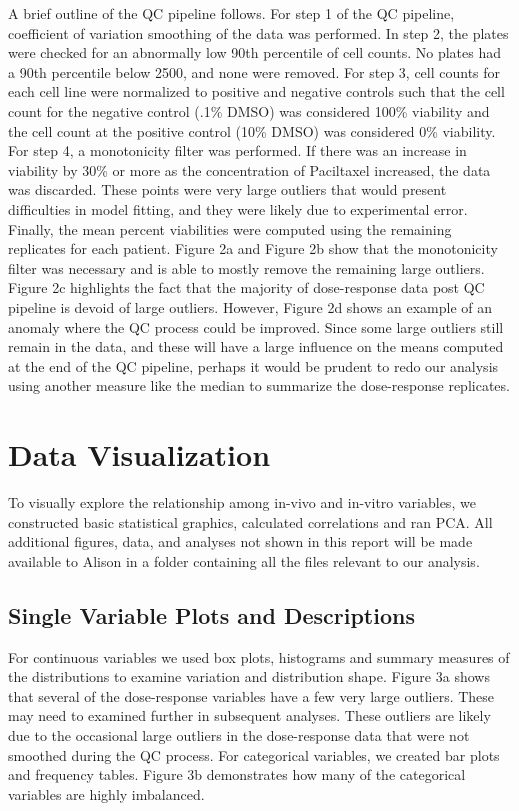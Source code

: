 \documentclass[12pt]{article}
\begin{document}
A brief outline of the QC pipeline follows.
For step 1 of the QC pipeline, coefficient of variation smoothing of the data was performed.  In step 2, the plates were checked for an abnormally low 90th percentile of cell counts. No plates had a 90th percentile below 2500, and none were removed. For step 3, cell counts for each cell line were normalized to positive and negative controls such that the cell count for the negative control (.1\% DMSO) was considered 100\% viability and the cell count at the positive control (10\% DMSO) was considered 0\% viability.  For step 4, a monotonicity filter was performed.  If there was an increase in viability by 30\% or more as the concentration of Paciltaxel increased, the data was discarded. These points were very large outliers that would present difficulties in model fitting, and they were likely due to experimental error. Finally, the mean percent viabilities were computed using the remaining replicates for each patient.  Figure 2a and Figure 2b show that the monotonicity filter was necessary and is able to mostly remove the remaining large outliers. Figure 2c highlights the fact that the majority of dose-response data post QC pipeline is devoid of large outliers.  However, Figure 2d shows an example of an anomaly where the QC process could be improved.  Since some large outliers still remain in the data, and these will have a large influence on the means computed at the end of the QC pipeline, perhaps it would be prudent to redo our analysis using another measure like the median to summarize the dose-response replicates.\\

\section{Data Visualization}

To visually explore the relationship among in-vivo and in-vitro variables, we constructed basic statistical graphics, calculated correlations and ran PCA. All additional figures, data, and analyses not shown in this report will be made available to Alison in a folder containing all the files relevant to our analysis.  
\subsection{Single Variable Plots and Descriptions}


For continuous variables we used box plots, histograms and summary measures of the distributions to examine variation and distribution shape. Figure 3a shows that several of the dose-response variables have a few very large outliers.  These may need to examined further in subsequent analyses.  These outliers are likely due to the occasional large outliers in the dose-response data that were not smoothed during the QC process.  For categorical variables, we created bar plots and frequency tables.  Figure 3b demonstrates how many of the categorical variables are highly imbalanced.\\
\end{document}
